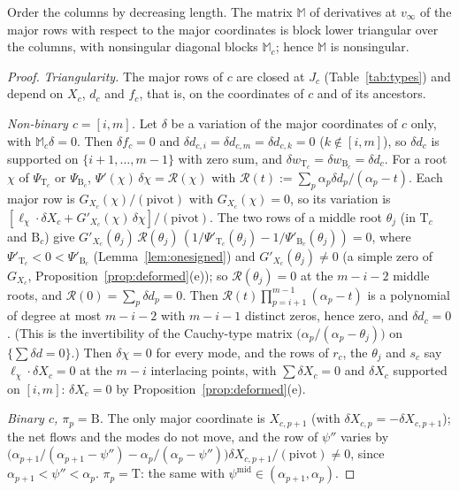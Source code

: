 \documentclass[11pt,a4paper]{report}
\newcommand{\Ts}{\mathrm T}
\newcommand{\Bs}{\mathrm B}
\newcommand{\Mm}{\mathbb M}
\begin{document}
\begin{proposition}\label{prop:majorblock}
Order the columns by decreasing length. The matrix \(\Mm\) of derivatives at \(v_\infty\) of the major rows with respect to the
major coordinates is block lower triangular over the columns, with nonsingular diagonal blocks \(\Mm_c\); hence \(\Mm\) is
nonsingular.
\end{proposition}
\begin{proof}
\emph{Triangularity.} The major rows of \(c\) are closed at \(J_c\) (Table~\ref{tab:types}) and depend on \(X_c\), \(d_c\) and \(f_c\), that is,
on the coordinates of \(c\) and of its ancestors.

\emph{Non-binary \(c=[i,m]\).} Let \(\delta\) be a variation of the major coordinates of \(c\) only, with \(\Mm_c\delta=0\). Then \(\delta f_c=0\) and
\(\delta d_{c,i}=\delta d_{c,m}=\delta d_{c,k}=0\) (\(k\notin[i,m]\)), so \(\delta d_c\) is supported on \(\{i+1,\dots,m-1\}\) with zero sum, and
\(\delta w_{\Ts_c}=\delta w_{\Bs_c}=\delta d_c\). For a root \(\chi\) of \(\Psi_{\Ts_c}\) or \(\Psi_{\Bs_c}\), \(\Psi'(\chi)\,\delta\chi=\mathcal R(\chi)\) with
\(\mathcal R(t):=\sum_p\alpha_p\delta d_p/(\alpha_p-t)\). Each major row is \(G_{X_c}(\chi)/(\text{pivot})\) with \(G_{X_c}(\chi)=0\), so its variation is
\([\ell_\chi\cdot\delta X_c+G'_{X_c}(\chi)\,\delta\chi]/(\text{pivot})\). The two rows of a middle root \(\theta_j\) (in \(\Ts_c\) and \(\Bs_c\)) give
\(G'_{X_c}(\theta_j)\,\mathcal R(\theta_j)\,(1/\Psi'_{\Ts_c}(\theta_j)-1/\Psi'_{\Bs_c}(\theta_j))=0\), where \(\Psi'_{\Ts_c}<0<\Psi'_{\Bs_c}\)
(Lemma~\ref{lem:onesigned}) and \(G'_{X_c}(\theta_j)\ne0\) (a simple zero of \(G_{X_c}\), Proposition~\ref{prop:deformed}(e)); so
\(\mathcal R(\theta_j)=0\) at the \(m-i-2\) middle roots, and \(\mathcal R(0)=\sum_p\delta d_p=0\). Then
\(\mathcal R(t)\prod_{p=i+1}^{m-1}(\alpha_p-t)\) is a polynomial of degree at most \(m-i-2\) with \(m-i-1\) distinct zeros, hence zero, and
\(\delta d_c=0\). (This is the invertibility of the Cauchy-type matrix \(\bigl(\alpha_p/(\alpha_p-\theta_j)\bigr)\) on \(\{\sum\delta d=0\}\).) Then
\(\delta\chi=0\) for every mode, and the rows of \(r_c\), the \(\theta_j\) and \(s_c\) say \(\ell_\chi\cdot\delta X_c=0\) at the \(m-i\) interlacing points,
with \(\sum\delta X_c=0\) and \(\delta X_c\) supported on \([i,m]\): \(\delta X_c=0\) by Proposition~\ref{prop:deformed}(e).

\emph{Binary \(c\), \(\pi_p=\Bs\).} The only major coordinate is \(X_{c,p+1}\) (with \(\delta X_{c,p}=-\delta X_{c,p+1}\)); the net flows and the
modes do not move, and the row of \(\psi''\) varies by
\(\bigl(\alpha_{p+1}/(\alpha_{p+1}-\psi'')-\alpha_p/(\alpha_p-\psi'')\bigr)\delta X_{c,p+1}/(\text{pivot})\ne0\), since \(\alpha_{p+1}<\psi''<\alpha_p\).
\(\pi_p=\Ts\): the same with \(\psi^{\mathrm{mid}}\in(\alpha_{p+1},\alpha_p)\).
\end{proof}
\end{document}
